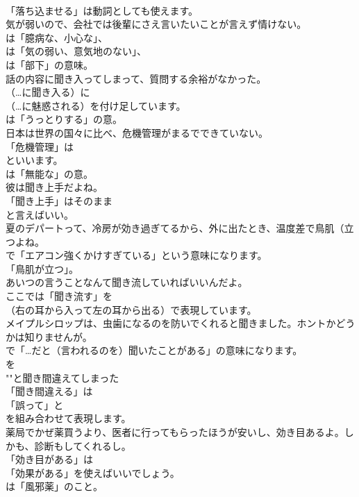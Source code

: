 \documentclass[8pt]{extreport}
\begin{document}
\begin{CJK}{UTF8}{min}
\\	「落ち込ませる」は動詞としても使えます。	
\\	気が弱いので、会社では後輩にさえ言いたいことが言えず情けない。 
\\	は「臆病な、小心な」、
\\	は「気の弱い、意気地のない」、
\\	は「部下」の意味。	
\\	話の内容に聞き入ってしまって、質問する余裕がなかった。 
\\	（…に聞き入る）に
\\	（…に魅惑される）を付け足しています。
\\	は「うっとりする」の意。	
\\	日本は世界の国々に比べ、危機管理がまるでできていない。 
\\	「危機管理」は
\\	といいます。
\\	は「無能な」の意。	
\\	彼は聞き上手だよね。 
\\	「聞き上手」はそのまま
\\	と言えばいい。	
\\	夏のデパートって、冷房が効き過ぎてるから、外に出たとき、温度差で鳥肌（立つよね。 
\\	で「エアコン強くかけすぎている」という意味になります。
\\	「鳥肌が立つ」。	
\\	あいつの言うことなんて聞き流していればいいんだよ。 
\\	ここでは「聞き流す」を 
\\	（右の耳から入って左の耳から出る）で表現しています。	
\\	メイプルシロップは、虫歯になるのを防いでくれると聞きました。ホントかどうかは知りませんが。 
\\	で「…だと（言われるのを）聞いたことがある」の意味になります。	
\\	を
\\	""と聞き間違えてしまった 
\\	「聞き間違える」は
\\	「誤って」と
\\	を組み合わせて表現します。
\\	薬局でかぜ薬買うより、医者に行ってもらったほうが安いし、効き目あるよ。しかも、診断もしてくれるし。 
\\	「効き目がある」は
\\	「効果がある」を使えばいいでしょう。
\\	は「風邪薬」のこと。	

\end{CJK}
\end{document}
